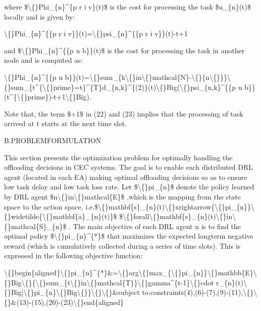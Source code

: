 \documentclass{article}
\begin{document}
where \$\textbackslash\{\}Phi\_\{n\}\textasciicircum{}\{p r i v\}(t)\$ is the cost for processing the task \$u\_\{n\}(t)\$ locally and is given by:

\textbackslash\{\}Phi\_\{n\}\textasciicircum{}\{\{p r i v\}\}(t)=\textbackslash\{\}psi\_\{n\}\textasciicircum{}\{\{p r i v\}\}(t)-t+1

and \$\textbackslash\{\}Phi\_\{n\}\textasciicircum{}\{\{p u b\}\}(t)\$ is the cost for processing the task in another node and is computed as:

\textbackslash\{\}Phi\_\{n\}\textasciicircum{}\{\{p u b\}\}(t)=\textbackslash\{\}sum\_\{k\textbackslash\{\}in\textbackslash\{\}mathcal\{N\}-\textbackslash\{\}\{n\textbackslash\{\}\}\}\textbackslash\{\}sum\_\{t\textasciicircum{}\{\textbackslash\{\}prime\}=t\}\textasciicircum{}\{T\}d\_\{n,k\}\textasciicircum{}\{(2)\}(t)\textbackslash\{\}Big(\textbackslash\{\}psi\_\{n,k\}\textasciicircum{}\{\{p u b\}\}(t\textasciicircum{}\{\textbackslash\{\}prime\})-t+1\textbackslash\{\}Big).

Note that, the term \$+1\$ in (22) and (23) implies that the processing of task arrived at t starts at the next time slot.

B.PROBLEMFORMULATION

This section presents the optimization problem for optimally handling the offloading decisions in CEC systems. The goal is to enable each distributed DRL agent (located in each EA) making optimal offloading decisions so as to ensure low task delay and low task loss rate.  Let \$\textbackslash\{\}pi\_\{n\}\$ denote the policy learned by DRL agent \$n\textbackslash\{\}in\textbackslash\{\}mathcal\{E\}\$ ,which is the mapping from the state space to the action space, i.e.\$\textbackslash\{\}mathbf\{s\}\_\{n\}(t)\textbackslash\{\}xrightarrow\{\textbackslash\{\}pi\_\{n\}\}\textbackslash\{\}widetilde\{\textbackslash\{\}mathbf\{a\}\_\{n\}(t)\}\$ \$\textbackslash\{\}forall\textbackslash\{\}mathbf\{s\}\_\{n\}(t)\textbackslash\{\}in\textbackslash\{\}mathcal\{S\}\_\{n\}\$ . The main objective of each DRL agent n is to find the optimal policy \$\textbackslash\{\}pi\_\{n\}\textasciicircum{}\{*\}\$ that maximizes the expected longterm negative reward (which is cumulatively collected during a series of time slots). This is expressed in the following objective function:

\textbackslash\{\}begin\{aligned\}\textbackslash\{\}pi\_\{n\}\textasciicircum{}\{*\}\&=\textbackslash\{\}arg\textbackslash\{\}max\_\{\textbackslash\{\}pi\_\{n\}\}\textbackslash\{\}mathbb\{E\}\textbackslash\{\}Big\textbackslash\{\}\{\textbackslash\{\}sum\_\{t\textbackslash\{\}in\textbackslash\{\}mathcal\{T\}\}\textbackslash\{\}gamma\textasciicircum{}\{t-1\}\textbackslash\{\}cdot r\_\{n\}(t)\textbackslash\{\}Big|\textbackslash\{\}pi\_\{n\}\textbackslash\{\}Big\textbackslash\{\}\}\textbackslash\{\}\textbackslash\{\}\&subject to:constraints(4),(6)-(7),(9)-(11),\textbackslash\{\}\textbackslash\{\}\&(13)-(15),(20)-(23)\textbackslash\{\}end\{aligned\}
\end{document}
